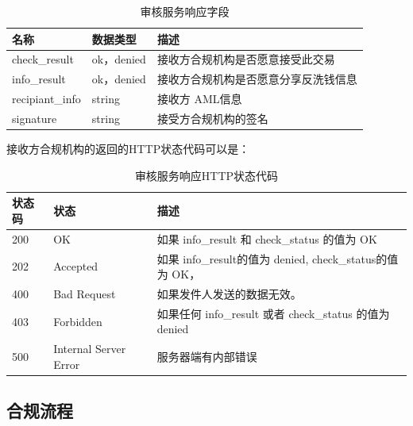 \begin{table}[h]
    \caption{审核服务响应字段} 
    \label{tab:auth_reply_field}
    \small %
    \centering %
    \begin{tabular}{lll} %
        \toprule[\heavyrulewidth]\toprule[\heavyrulewidth]
        \textbf{名称} & \textbf{数据类型} & \textbf{描述} \\ 
        \hline
        check\_result & ok，denied & 接收方合规机构是否愿意接受此交易 \\
        \hline
        info\_result & ok，denied & 接收方合规机构是否愿意分享反洗钱信息 \\
        \hline
        recipiant\_info & string &  接收方 AML信息 \\
        \hline
        signature & string & 接受方合规机构的签名 \\
        \bottomrule[\heavyrulewidth] 
    \end{tabular}
\end{table}

接收方合规机构的返回的HTTP状态代码可以是：
\begin{table}[h]
    \caption{审核服务响应HTTP状态代码} 
    \label{tab:auth_http_status}
    \small %
    \centering %
    \begin{tabular}{lll} %
        \toprule[\heavyrulewidth]\toprule[\heavyrulewidth]
        \textbf{状态码} & \textbf{状态} & \textbf{描述} \\ 
        \hline
        200 & OK & 如果 info\_result 和 check\_status 的值为 OK \\
        \hline
        202 & Accepted &  如果 info\_result的值为 denied, check\_status的值为 OK，\\
        \hline
        400 & Bad Request &  如果发件人发送的数据无效。\\
        \hline
        403 & Forbidden &  如果任何 info\_result 或者 check\_status 的值为 denied\\
        \hline
        500 & Internal Server Error &  服务器端有内部错误 \\
        \bottomrule[\heavyrulewidth] 
    \end{tabular}
\end{table}

\subsection{合规流程}

